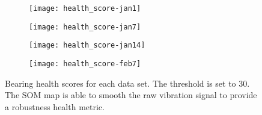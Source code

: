 \begin{figure}[!h]
    \centering
    \begin{subfigure}{6cm}
        \centering\texttt{[image: health\_score-jan1]}
    \end{subfigure}%
    \begin{subfigure}{6cm}
        \centering\texttt{[image: health\_score-jan7]}
    \end{subfigure}\vspace{10pt}
 
    \begin{subfigure}{6cm}
        \centering\texttt{[image: health\_score-jan14]}
    \end{subfigure}%
    \begin{subfigure}{6cm}
        \centering\texttt{[image: health\_score-feb7]}
    \end{subfigure}
    \caption{Bearing health scores for each data set. The threshold is set to 30. The SOM map is able to smooth the raw vibration signal to provide a robustness health metric.}
    \label{fig:health}
\end{figure}
